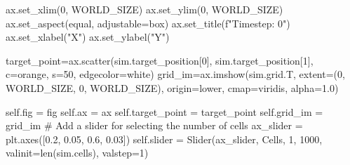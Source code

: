 \documentclass[
  letterpaper,
  DIV=11,
  numbers=noendperiod]{scrreprt}
\newenvironment{Shaded}{\begin{snugshade}}{\end{snugshade}}
\newcommand{\BuiltInTok}[1]{\textcolor[rgb]{0.00,0.23,0.31}{#1}}
\newcommand{\CommentTok}[1]{\textcolor[rgb]{0.37,0.37,0.37}{#1}}
\newcommand{\DecValTok}[1]{\textcolor[rgb]{0.68,0.00,0.00}{#1}}
\newcommand{\FloatTok}[1]{\textcolor[rgb]{0.68,0.00,0.00}{#1}}
\newcommand{\NormalTok}[1]{\textcolor[rgb]{0.00,0.23,0.31}{#1}}
\newcommand{\OperatorTok}[1]{\textcolor[rgb]{0.37,0.37,0.37}{#1}}
\newcommand{\SpecialStringTok}[1]{\textcolor[rgb]{0.13,0.47,0.30}{#1}}
\newcommand{\StringTok}[1]{\textcolor[rgb]{0.13,0.47,0.30}{#1}}
\newcommand{\VariableTok}[1]{\textcolor[rgb]{0.07,0.07,0.07}{#1}}
\theoremstyle{definition}
\theoremstyle{remark}
\begin{document}
\begin{tcolorbox}
\begin{Shaded}
\begin{Highlighting}[]
\NormalTok{        ax.set\_xlim(}\DecValTok{0}\NormalTok{, WORLD\_SIZE)}
\NormalTok{        ax.set\_ylim(}\DecValTok{0}\NormalTok{, WORLD\_SIZE)}
\NormalTok{        ax.set\_aspect(}\StringTok{\textquotesingle{}equal\textquotesingle{}}\NormalTok{, adjustable}\OperatorTok{=}\StringTok{\textquotesingle{}box\textquotesingle{}}\NormalTok{)}
\NormalTok{        ax.set\_title(}\SpecialStringTok{f"Timestep: 0"}\NormalTok{)}
\NormalTok{        ax.set\_xlabel(}\StringTok{"X"}\NormalTok{)}
\NormalTok{        ax.set\_ylabel(}\StringTok{"Y"}\NormalTok{)}

\NormalTok{        target\_point}\OperatorTok{=}\NormalTok{ax.scatter(sim.target\_position[}\DecValTok{0}\NormalTok{], sim.target\_position[}\DecValTok{1}\NormalTok{], c}\OperatorTok{=}\StringTok{\textquotesingle{}orange\textquotesingle{}}\NormalTok{, s}\OperatorTok{=}\DecValTok{50}\NormalTok{, edgecolor}\OperatorTok{=}\StringTok{\textquotesingle{}white\textquotesingle{}}\NormalTok{)}
\NormalTok{        grid\_im}\OperatorTok{=}\NormalTok{ax.imshow(sim.grid.T, extent}\OperatorTok{=}\NormalTok{(}\DecValTok{0}\NormalTok{, WORLD\_SIZE, }\DecValTok{0}\NormalTok{, WORLD\_SIZE), origin}\OperatorTok{=}\StringTok{\textquotesingle{}lower\textquotesingle{}}\NormalTok{, cmap}\OperatorTok{=}\StringTok{\textquotesingle{}viridis\textquotesingle{}}\NormalTok{, alpha}\OperatorTok{=}\FloatTok{1.0}\NormalTok{)}

        \VariableTok{self}\NormalTok{.fig }\OperatorTok{=}\NormalTok{ fig}
        \VariableTok{self}\NormalTok{.ax }\OperatorTok{=}\NormalTok{ ax}
        \VariableTok{self}\NormalTok{.target\_point }\OperatorTok{=}\NormalTok{ target\_point}
        \VariableTok{self}\NormalTok{.grid\_im }\OperatorTok{=}\NormalTok{ grid\_im}
        \CommentTok{\# Add a slider for selecting the number of cells}
\NormalTok{        ax\_slider }\OperatorTok{=}\NormalTok{ plt.axes([}\FloatTok{0.2}\NormalTok{, }\FloatTok{0.05}\NormalTok{, }\FloatTok{0.6}\NormalTok{, }\FloatTok{0.03}\NormalTok{])}
        \VariableTok{self}\NormalTok{.slider }\OperatorTok{=}\NormalTok{ Slider(ax\_slider, }\StringTok{\textquotesingle{}Cells\textquotesingle{}}\NormalTok{, }\DecValTok{1}\NormalTok{, }\DecValTok{1000}\NormalTok{, valinit}\OperatorTok{=}\BuiltInTok{len}\NormalTok{(sim.cells), valstep}\OperatorTok{=}\DecValTok{1}\NormalTok{)}


\end{Highlighting}
\end{Shaded}
\end{tcolorbox}
\end{document}
